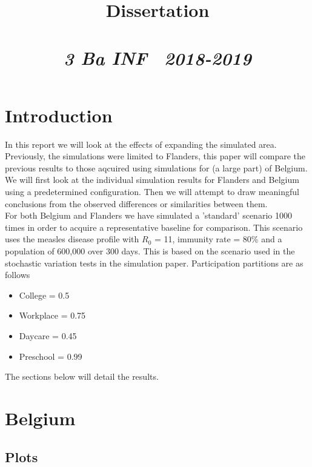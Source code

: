 \documentclass{article}
\title{\textmd{\textbf{Dissertation}}\\\normalsize\vspace{0.1in}\Large{\assignmentname}\\\vspace{0.1in}\small{\textit{3 Ba INF \  2018-2019}}}
\author{\studentA}
\date{}
\begin{document}
\maketitle

\section{Introduction}
In this report we will look at the effects of expanding the simulated area. Previously, the simulations were limited to Flanders, this paper will compare the previous results to those aqcuired using simulations for (a large part) of Belgium. We will first look at the individual simulation results for Flanders and Belgium using a predetermined configuration. Then we will attempt to draw meaningful conclusions from the observed differences or similarities between them. \\
For both Belgium and Flanders we have simulated a 'standard' scenario 1000 times in order to acquire a representative baseline for comparison. This scenario uses the measles disease profile with $R_0$ = 11, immunity rate = 80\% and a population of 600,000 over 300 days. This is based on the scenario used in the stochastic variation tests in the simulation paper. Participation partitions are as follows
\begin{itemize}
	\item College = 0.5
	\item Workplace = 0.75
	\item Daycare = 0.45
	\item Preschool = 0.99
\end{itemize} 
The sections below will detail the results.

\section{Belgium}
\subsection{Plots}
\end{document}
